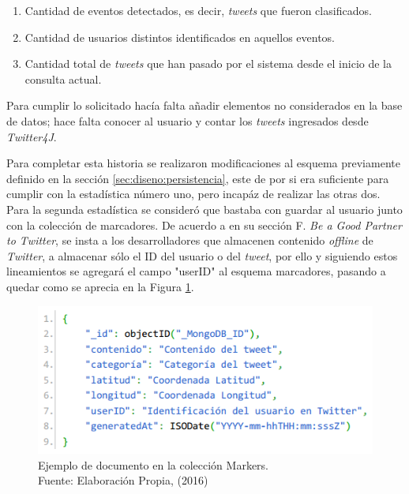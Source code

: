 \begin{enumerate}
\item Cantidad de eventos detectados, es decir, \textit{tweets} que fueron clasificados.
\item Cantidad de usuarios distintos identificados en aquellos eventos.
\item Cantidad total de \textit{tweets} que han pasado por el sistema desde el inicio de la consulta actual.
\end{enumerate}

Para cumplir lo solicitado hacía falta añadir elementos no considerados en la base de datos; hace falta conocer al usuario y contar los \textit{tweets} ingresados desde \textit{Twitter4J}.

Para completar esta historia se realizaron modificaciones al esquema previamente definido en la sección \ref{sec:diseno:persistencia}, este de por si era suficiente para cumplir con la estadística número uno, pero incapáz de realizar las otras dos. Para la segunda estadística se consideró que bastaba con guardar al usuario junto con la colección de marcadores. De acuerdo a \cite{TwitterAgreement} en su sección F. \textit{Be a Good Partner to Twitter}, se insta a los desarrolladores que almacenen contenido \textit{offline} de \textit{Twitter}, a almacenar sólo el ID del usuario o del \textit{tweet}, por ello y siguiendo estos lineamientos se agregará el campo "userID" al esquema marcadores, pasando a quedar como se aprecia en la Figura \ref{fig:esquemaMarker2}.

\begin{figure}[H]
	\centering
	\captionsetup{justification=centering}
	\includegraphics[scale=0.8]{images/Marker2.png}
	\caption[Ejemplo de documento en la colección Markers.]{Ejemplo de documento en la colección Markers.\\Fuente: Elaboración Propia, (2016)}
	\label{fig:esquemaMarker2}
\end{figure}

